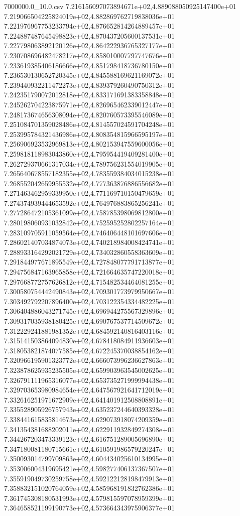 \begin{filecontents*}{7000000.0_10.0.csv}
7.216156097073894671e+02,4.889088050925147400e+01
7.219066504225824019e+02,4.882869762719838036e+01
7.221976967753233794e+02,4.876652814264889457e+01
7.224887487645498823e+02,4.870437205600137531e+01
7.227798063892120126e+02,4.864222936765327177e+01
7.230708696482478217e+02,4.858010007797747676e+01
7.233619385406186666e+02,4.851798418736780150e+01
7.236530130652720345e+02,4.845588169621169072e+01
7.239440932211472273e+02,4.839379260490750312e+01
7.242351790072012818e+02,4.833171691383358848e+01
7.245262704223875971e+02,4.826965462339012447e+01
7.248173674656308094e+02,4.820760573395546089e+01
7.251084701359028486e+02,4.814557024591704248e+01
7.253995784321436986e+02,4.808354815966595197e+01
7.256906923532969813e+02,4.802153947559600056e+01
7.259818118983043860e+02,4.795954419409281400e+01
7.262729370661317034e+02,4.789756231554019905e+01
7.265640678557182355e+02,4.783559384034015238e+01
7.268552042659955532e+02,4.777363876886556682e+01
7.271463462959339950e+02,4.771169710150479659e+01
7.274374939444653592e+02,4.764976883865256241e+01
7.277286472105361099e+02,4.758785398069812800e+01
7.280198060931032842e+02,4.752595252802257164e+01
7.283109705911059564e+02,4.746406448101697606e+01
7.286021407034874073e+02,4.740218984008424741e+01
7.288933164292021729e+02,4.734032860558363609e+01
7.291844977671895549e+02,4.727848077791713877e+01
7.294756847163965858e+02,4.721664635747220018e+01
7.297668772757626812e+02,4.715482534464081255e+01
7.300580754442490843e+02,4.709301773979950667e+01
7.303492792207896400e+02,4.703122354334482225e+01
7.306404886043271745e+02,4.696944275567329896e+01
7.309317035938180425e+02,4.690767537714509672e+01
7.312229241881981352e+02,4.684592140816403116e+01
7.315141503864094830e+02,4.678418084911936603e+01
7.318053821874077585e+02,4.672245370038854162e+01
7.320966195901323772e+02,4.666073996236627863e+01
7.323878625935235505e+02,4.659903963545002625e+01
7.326791111965316077e+02,4.653735271999994438e+01
7.329703653980984654e+02,4.647567921641712019e+01
7.332616251971672909e+02,4.641401912508808891e+01
7.335528905926757943e+02,4.635237244640393328e+01
7.338441615835814673e+02,4.629073918074209359e+01
7.341354381688202011e+02,4.622911932849274308e+01
7.344267203473339123e+02,4.616751289005696890e+01
7.347180081180715661e+02,4.610591986579220247e+01
7.350093014799709863e+02,4.604434025610134995e+01
7.353006004319695421e+02,4.598277406137367507e+01
7.355919049730259758e+02,4.592122128198479913e+01
7.358832151020764059e+02,4.585968191832762386e+01
7.361745308180531993e+02,4.579815597078959399e+01
7.364658521199190773e+02,4.573664343975906377e+01

\end{filecontents*}
